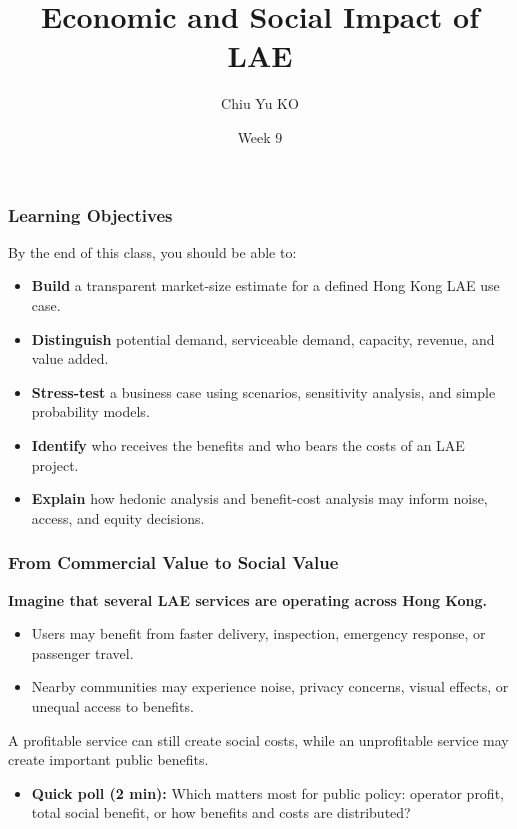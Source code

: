 \documentclass{beamer}
\begin{document}
\begin{frame}
  \title{Economic and Social Impact of LAE}
  \author{Chiu Yu KO}
  \date{Week 9}
  \titlepage
\end{frame}


\begin{frame}[t]
\frametitle{Learning Objectives}
By the end of this class, you should be able to:
\begin{itemize}
\item \textbf{Build} a transparent market-size estimate for a defined Hong Kong LAE use case.
\item \textbf{Distinguish} potential demand, serviceable demand, capacity, revenue, and value added.
\item \textbf{Stress-test} a business case using scenarios, sensitivity analysis, and simple probability models.
\item \textbf{Identify} who receives the benefits and who bears the costs of an LAE project.
\item \textbf{Explain} how hedonic analysis and benefit-cost analysis may inform noise, access, and equity decisions.
\end{itemize}
\end{frame}

\begin{frame}[t]
\frametitle{From Commercial Value to Social Value}
\textbf{Imagine that several LAE services are operating across Hong Kong.}
\begin{itemize}
\item Users may benefit from faster delivery, inspection, emergency response, or passenger travel.
\item Nearby communities may experience noise, privacy concerns, visual effects, or unequal access to benefits.
\end{itemize}
\vspace{0.3cm}
A profitable service can still create social costs, while an unprofitable service may create important public benefits.
\begin{itemize}
\item \textbf{Quick poll (2 min):} Which matters most for public policy: operator profit, total social benefit, or how benefits and costs are distributed?
\end{itemize}
\end{frame}
\end{document}
